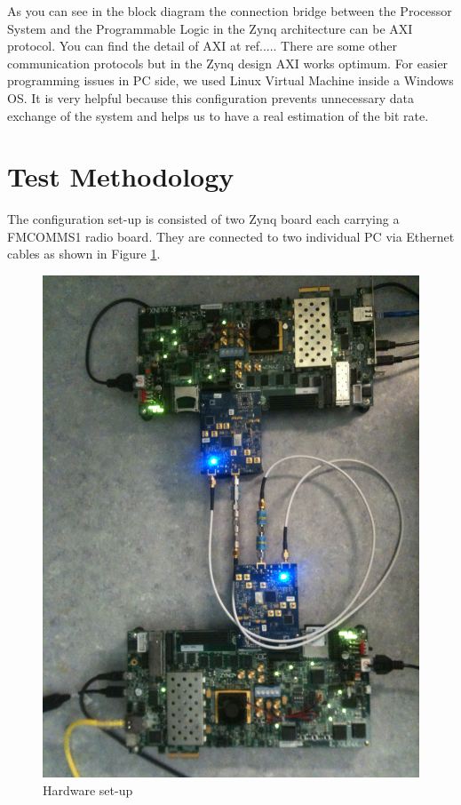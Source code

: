 As you can see in the block diagram the connection bridge between the Processor System and the Programmable Logic in the Zynq architecture can be AXI protocol. You can find the detail of AXI at ref..... There are some other communication protocols but in the Zynq design AXI works optimum.
For easier programming issues in PC side, we used Linux Virtual Machine inside a Windows OS. It is very helpful because this configuration prevents unnecessary data exchange of the system and helps us to have a real estimation of the bit rate.\\

\section{Test Methodology}
The configuration set-up is consisted of two Zynq board each carrying a FMCOMMS1 radio board. They are connected to two individual PC via Ethernet cables as shown in Figure \ref{fig:hardware_setup}.\\

\begin{figure}
\centering
\includegraphics[width=\textwidth]{content/fig/hardware_setup.JPG}
\caption{Hardware set-up}
\label{fig:hardware_setup}
\end{figure}

